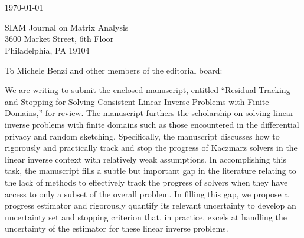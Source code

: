 \documentclass[11pt]{article}
\begin{document}
\section*{}

\noindent

\vspace{12pt}
\noindent\today

\vspace{12pt}
\noindent
SIAM Journal on Matrix Analysis \\
3600 Market Street, 6th Floor \\
Philadelphia, PA 19104

\vspace{12pt}
\noindent
To Michele Benzi and other members of the editorial board:
\medskip

We are writing to submit the enclosed manuscript, entitled ``Residual Tracking and Stopping for Solving Consistent Linear Inverse Problems with Finite Domains,'' for review. The manuscript furthers the scholarship on solving linear inverse problems with finite domains such as those encountered in the differential privacy and random sketching. Specifically, the manuscript discusses how to rigorously and practically track and stop the progress of Kaczmarz solvers in the linear inverse context with relatively weak assumptions.  In accomplishing this task, the manuscript fills a subtle but important gap in the literature relating to the lack of methods to effectively track the progress of solvers when they have access to only a subset of the overall problem. In filling this gap, we propose a progress estimator and rigorously quantify its relevant uncertainty to develop an uncertainty set and stopping criterion that, in practice, excels at handling the uncertainty of the estimator for these linear inverse problems.
\medskip
\end{document}
